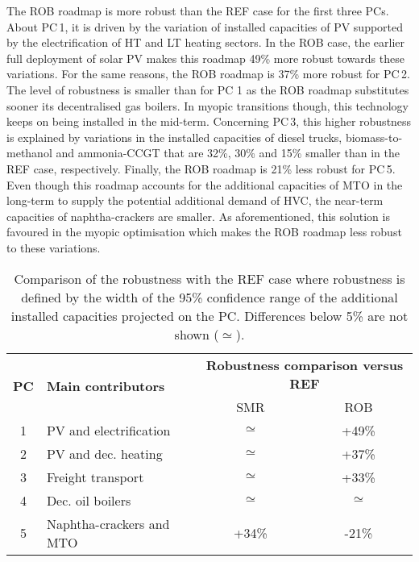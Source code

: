 The ROB roadmap is more robust than the REF case for the first three PCs. About PC\,1, it is driven by the variation of installed capacities of \gls{PV} supported by the electrification of \gls{HT} and \gls{LT} heating sectors. In the ROB case, the earlier full deployment of solar \gls{PV} makes this roadmap 49\% more robust towards these variations. For the same reasons, the ROB roadmap is 37\% more robust for PC\,2. The level of robustness is smaller than for PC 1 as the ROB roadmap substitutes sooner its decentralised gas boilers. In myopic transitions though, this technology keeps on being installed in the mid-term. Concerning PC\,3, this higher robustness is explained by variations in the installed capacities of diesel trucks, biomass-to-methanol and ammonia-\gls{CCGT} that are 32\%, 30\% and 15\% smaller than in the REF case, respectively.  Finally, the ROB roadmap is 21\% less robust for PC\,5. Even though this roadmap accounts for the additional capacities of \gls{MTO} in the long-term to supply the potential additional demand of \gls{HVC}, the near-term capacities of naphtha-crackers are smaller. As aforementioned, this solution is favoured in the myopic optimisation which makes the ROB roadmap less robust to these variations.

\begin{table}[htbp!]
\caption{Comparison of the robustness with the REF case where robustness is defined by the width of the 95\% confidence range of the additional installed capacities projected on the PC. Differences below 5\% are not shown ($\simeq$).}
\label{tab:projection}
\centering
\begin{tabular}{c l| c c}
\toprule
\multirow{2}{*}{\textbf{PC}} & \multirow{2}{*}{\textbf{Main contributors}} & \multicolumn{2}{c}{\textbf{Robustness comparison versus REF}}\\
& & SMR & ROB \\
\midrule
1 & \gls{PV} and electrification & $\simeq$ & +49\% \\
2 & \gls{PV} and dec. heating & $\simeq$ & +37\%\\
3 & Freight transport & $\simeq$ & +33\%\\
4 & Dec. oil boilers & $\simeq$ & $\simeq$ \\
5 &  Naphtha-crackers and \gls{MTO} & +34\% & -21\%\\
\bottomrule							
\end{tabular}
\end{table}

